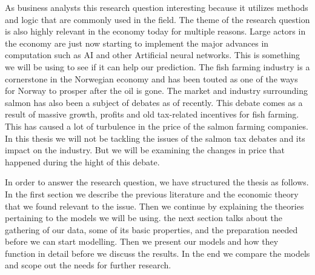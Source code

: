 As business analysts this research question interesting because it utilizes methods and logic that are commonly used in the field. The theme of the research question is also highly relevant in the economy today for multiple reasons. Large actors in the economy are just now starting to implement the major advances in computation such as AI and other Artificial neural networks. This is something we will be using to see if it can help our prediction. The fish farming industry is a cornerstone in the Norwegian economy and has been touted as one of the ways for Norway to prosper after the oil is gone. The market and industry surrounding salmon has also been a subject of debates as of recently. This debate comes as a result of massive growth, profits and old tax-related incentives for fish farming. This has caused a lot of turbulence in the price of the salmon farming companies. In this thesis we will not be tackling the issues of the salmon tax debates and its impact on the industry. But we will be examining the changes in price that happened during the hight of this debate.

In order to answer the research question, we have structured the thesis as follows. In the first section we describe the previous literature and the economic theory that we found relevant to the issue. Then we continue by explaining the theories pertaining to the models we will be using. the next section talks about the gathering of our data, some of its basic properties, and the preparation needed before we can start modelling. Then we present our models and how they function in detail before we discuss the results. In the end we compare the models and scope out the needs for further research. 
